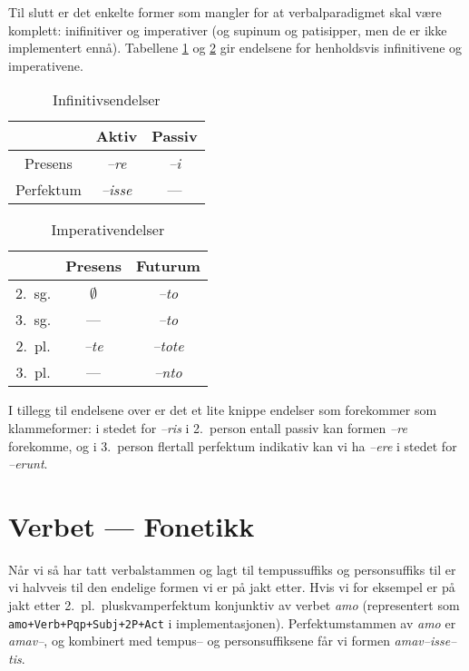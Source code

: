 \documentclass[a4paper]{article}
\begin{document}
Til slutt er det enkelte former som mangler for at verbalparadigmet skal
v\ae{}re komplett: inifinitiver og imperativer (og supinum og patisipper, men
de er ikke implementert enn\aa{}). Tabellene \ref{infinitiv} og
\ref{imperativ} gir endelsene for henholdsvis infinitivene og imperativene.

\begin{table}[hp]
\begin{center}
\begin{tabular}{|c|c|c|}
    \hline
          & Aktiv        & Passiv \\
    \hline
Presens   & \emph{--re}  & \emph{--i} \\
Perfektum & \emph{--isse} & --- \\
    \hline
\end{tabular}
\caption{Infinitivsendelser}
\label{infinitiv}
\end{center}
\end{table}

\begin{table}[hp]
\begin{center}
\begin{tabular}{|c|c|c|}
    \hline
       & Presens & Futurum \\
    \hline
2.~sg. & $\emptyset$ & \emph{--to} \\
3.~sg. & ---        & \emph{--to} \\
2.~pl. & \emph{--te} & \emph{--tote} \\
3.~pl. & ---         & \emph{--nto} \\
    \hline
\end{tabular}
\caption{Imperativendelser}
\label{imperativ}
\end{center}
\end{table}

I tillegg til endelsene over er det et lite knippe endelser som forekommer som
klammeformer: i stedet for \emph{--ris} i 2.~person entall passiv kan formen
\emph{--re} forekomme, og i 3.~person flertall perfektum indikativ kan vi ha
\emph{--ere} i stedet for \emph{--erunt}.

\section{Verbet --- Fonetikk}
N\aa{}r vi s\aa{} har tatt verbalstammen og lagt til tempussuffiks og
personsuffiks til er vi halvveis til den endelige formen vi er p\aa{} jakt
etter. Hvis vi for eksempel er p\aa{} jakt etter 2.~pl.~pluskvamperfektum
konjunktiv av verbet \emph{amo} (representert som
\texttt{amo+Verb+Pqp+Subj+2P+Act} i implementasjonen). Perfektumstammen av
\emph{amo} er \emph{amav--}, og kombinert med tempus-- og personsuffiksene
f\aa{}r vi formen \emph{amav--isse--tis}.
\end{document}
